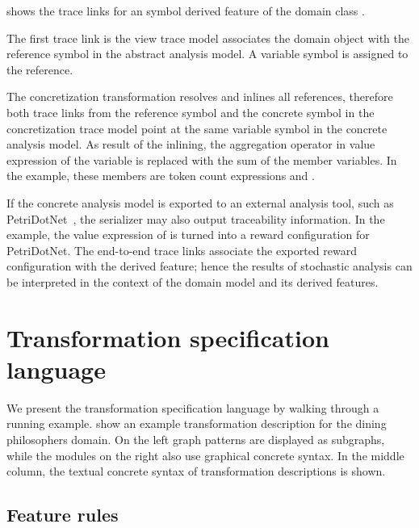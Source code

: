 \begin{runningExample}
   shows the trace links for an  symbol derived feature  of the domain class .

  The first trace link is the view trace model associates the domain object  with the reference symbol  in the abstract analysis model. A variable symbol is assigned to the reference.

  The concretization transformation resolves and inlines all references, therefore both trace links from the reference symbol and the concrete symbol in the concretization trace model point at the same variable symbol in the concrete analysis model. As result of the inlining, the aggregation operator in value expression of the variable is replaced with the sum of the member variables. In the example, these members are token count expressions  and .

  If the concrete analysis model is exported to an external analysis tool, such as PetriDotNet~\citep{Voros17pdn}, the  serializer may also output traceability information. In the example, the value expression of  is turned into a reward configuration for PetriDotNet. The end-to-end trace links associate the exported reward configuration with the derived feature; hence the results of stochastic analysis can be interpreted in the context of the domain model and its derived features.
\end{runningExample}

\section{Transformation specification language}

We present the transformation specification language by walking through a running example.  show an example transformation description for the dining philosophers domain. On the left graph patterns are displayed as subgraphs, while the  modules on the right also use graphical concrete syntax. In the middle column, the textual concrete syntax of transformation descriptions is shown.

\subsection{Feature rules}

